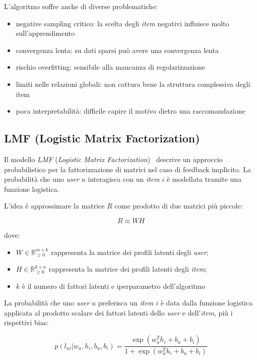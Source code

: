 L'algoritmo soffre anche di diverse problematiche:

\begin{itemize}
    \item negative sampling critico: la scelta degli \textit{item} negativi influisce molto sull'apprendimento
    \item convergenza lenta: su dati sparsi può avere una convergenza lenta
    \item rischio overfitting: sensibile alla mancanza di regolarizzazione
    \item limiti nelle relazioni globali: non cattura bene la struttura complessiva degli item
    \item poca interpretabilità: difficile capire il motivo dietro una raccomandazione
\end{itemize}

\subsection{LMF (Logistic Matrix Factorization)}\label{lmf}

Il modello \textit{LMF} (\textit{Logistic Matrix Factorization})~\cite{LMF} descrive un approccio probabilistico per la fattorizzazione di matrici nel caso di feedback implicito. La probabilità che uno \textit{user} $u$ interagisca con un \textit{item} $i$ è modellata tramite una funzione logistica.

L'idea è approssimare la matrice $R$ come prodotto di due matrici più piccole:

\[
R \approx WH
\]

dove:

\begin{itemize}
    \item $W \in \mathbb{R}_{\geq 0}^{m \times k}$ rappresenta la matrice dei profili latenti degli \textit{user};
    \item $H \in \mathbb{R}_{\geq 0}^{k \times n}$ rappresenta la matrice dei profili latenti degli \textit{item};
    \item $k$ è il numero di fattori latenti e iperparametro dell'algoritmo
\end{itemize}

La probabilità che uno \textit{user} $u$ preferisca un \textit{item} $i$ è data dalla funzione logistica applicata al prodotto scalare dei fattori latenti dello \textit{user} e dell'\textit{item}, più i rispettivi bias:

\[
p(l_{ui} | w_u, h_i, b_u, b_i) = \frac{\exp(w_u^T h_i + b_u + b_i)}{1 + \exp(w_u^T h_i + b_u + b_i)}
\]

